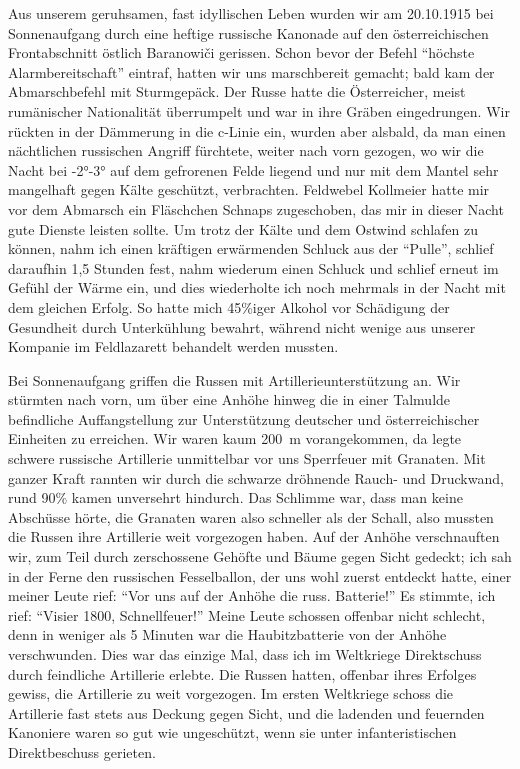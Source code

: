 \documentclass[a5paper,pagesize,10pt,twoside=true]{scrbook}
\begin{document}
Aus unserem geruhsamen, fast idyllischen Leben wurden wir am 20.10.1915 bei Sonnenaufgang durch eine heftige russische Kanonade auf den österreichischen Frontabschnitt östlich Baranowiči gerissen. Schon bevor der Befehl \enquote{höchste Alarmbereitschaft} eintraf, hatten wir uns marschbereit gemacht; bald kam der Abmarschbefehl mit Sturmgepäck. Der Russe hatte die Österreicher, meist rumänischer Nationalität überrumpelt und war in ihre Gräben eingedrungen. Wir rückten in der Dämmerung in die c-Linie ein, wurden aber alsbald, da man einen nächtlichen russischen Angriff fürchtete, weiter nach vorn gezogen, wo wir die Nacht bei -2°-3° auf dem gefrorenen Felde liegend und nur mit dem Mantel sehr mangelhaft gegen Kälte geschützt, verbrachten. Feldwebel Kollmeier hatte mir vor dem Abmarsch ein Fläschchen Schnaps zugeschoben, das mir in dieser Nacht gute Dienste leisten sollte. Um trotz der Kälte und dem Ostwind schlafen zu können, nahm ich einen kräftigen erwärmenden Schluck aus der \enquote{Pulle}, schlief daraufhin 1,5 Stunden fest, nahm wiederum einen Schluck und schlief erneut im Gefühl der Wärme ein, und dies wiederholte ich noch mehrmals in der Nacht mit dem gleichen Erfolg. So hatte mich 45\%iger Alkohol vor Schädigung der Gesundheit durch Unterkühlung bewahrt, während nicht wenige aus unserer Kompanie im Feldlazarett behandelt werden mussten.

Bei Sonnenaufgang griffen die Russen mit Artillerieunterstützung an. Wir stürmten nach vorn, um über eine Anhöhe hinweg die in einer Talmulde befindliche Auffangstellung zur Unterstützung deutscher und österreichischer Einheiten zu erreichen. Wir waren kaum 200~m vorangekommen, da legte schwere russische Artillerie unmittelbar vor uns Sperrfeuer mit Granaten. Mit ganzer Kraft rannten wir durch die schwarze dröhnende Rauch- und Druckwand, rund 90\% kamen unversehrt hindurch. Das Schlimme war, dass man keine Abschüsse hörte, die Granaten waren also schneller als der Schall, also mussten die Russen ihre Artillerie weit vorgezogen haben. Auf der Anhöhe verschnauften wir, zum Teil durch zerschossene Gehöfte und Bäume gegen Sicht gedeckt; ich sah in der Ferne den russischen Fesselballon, der uns wohl zuerst entdeckt hatte, einer meiner Leute rief: \enquote{Vor uns auf der Anhöhe die russ. Batterie!} Es stimmte, ich rief: \enquote{Visier 1800, Schnellfeuer!} Meine Leute schossen offenbar nicht schlecht, denn in weniger als 5 Minuten war die Haubitzbatterie von der Anhöhe verschwunden. Dies war das einzige Mal, dass ich im Weltkriege Direktschuss durch feindliche Artillerie erlebte. Die Russen hatten, offenbar ihres Erfolges gewiss, die Artillerie zu weit vorgezogen. Im ersten Weltkriege schoss die Artillerie fast stets aus Deckung gegen Sicht, und die ladenden und feuernden Kanoniere waren so gut wie ungeschützt, wenn sie unter infanteristischen Direktbeschuss gerieten.
\end{document}
